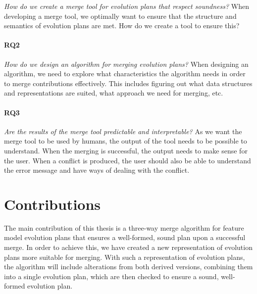 \documentclass[a4paper,english]{ifimaster}
\begin{document}
\textit{How do we create a merge tool for evolution plans that respect soundness?} When developing a merge tool, we optimally want to ensure that the structure and semantics of evolution plans are met. How do we create a tool to ensure this?

\paragraph{RQ2}

\textit{How do we design an algorithm for merging evolution plans?} When designing an algorithm, we need to explore what characteristics the algorithm needs in order to merge contributions effectively. This includes figuring out what data structures and representations are suited, what approach we need for merging, etc.

\paragraph{RQ3}

\textit{Are the results of the merge tool predictable and interpretable?} As we want the merge tool to be used by humans, the output of the tool needs to be possible to understand. When the merging is successful, the output needs to make sense for the user. When a conflict is produced, the user should also be able to understand the error message and have ways of dealing with the conflict.


\section{Contributions}%
\label{sec:contributions}

The main contribution of this thesis is a three-way merge algorithm for feature model evolution plans that ensures a well-formed, sound plan upon a successful merge. In order to achieve this, we have created a new representation of evolution plans more suitable for merging. With such a representation of evolution plans, the algorithm will include alterations from both derived versions, combining them into a single evolution plan, which are then checked to ensure a sound, well-formed evolution plan.
\end{document}
